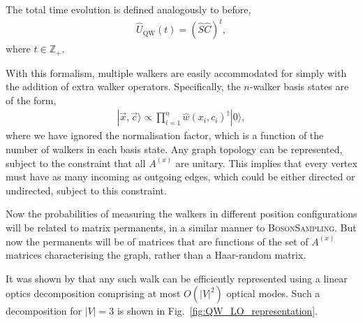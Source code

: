 \documentclass[aps,rmp,twocolumn,amsmath,amssymb,nofootinbib,superscriptaddress,longbibliography,floatfix,table-of-contents,eqsecnum]{revtex4-1}
\newcommand{\ket}[1]{|#1\rangle}
\begin{document}
The total time evolution is defined analogously to before,
\begin{align}
\hat{U}_\text{QW}(t) = (\hat{S}\hat{C})^t,
\end{align}
where \mbox{$t\in \mathbb{Z}_+$}.

With this formalism, multiple walkers are easily accommodated for simply with the addition of extra walker operators. Specifically, the $n$-walker basis states are of the form,
\begin{align}
\ket{\vec{x},\vec{c}} \propto \prod_{i=1}^n \hat{w}(x_i,c_i)^\dag \ket{0},
\end{align}
where we have ignored the normalisation factor, which is a function of the number of walkers in each basis state. Any graph topology can be represented, subject to the constraint that all $A^{(x)}$ are unitary. This implies that every vertex must have as many incoming as outgoing edges, which could be either directed or undirected, subject to this constraint.

Now the probabilities of measuring the walkers in different position configurations will be related to matrix permanents, in a similar manner to \textsc{BosonSampling}. But now the permanents will be of matrices that are functions of the set of $A^{(x)}$ matrices characterising the graph, rather than a Haar-random matrix.

It was shown by \cite{bib:RohdeMultiWalk11} that any such walk can be efficiently represented using a linear optics decomposition comprising at most $O(|V|^2)$ optical modes. Such a decomposition for \mbox{$|V|=3$} is shown in Fig.~\ref{fig:QW_LO_representation}.
\end{document}

